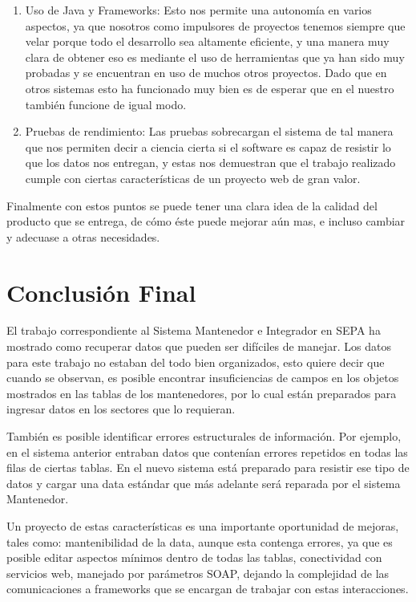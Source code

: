 \documentclass[a4paper,12pt,openany,oneside]{book}
\begin{document}
\begin{enumerate}
        \item Uso de Java y Frameworks: Esto nos permite una autonomía en varios aspectos, ya que nosotros como impulsores de proyectos tenemos siempre que velar porque todo el desarrollo sea altamente eficiente, y una manera muy clara de obtener eso es mediante el uso de herramientas que ya han sido muy probadas y se encuentran en uso de muchos otros proyectos. Dado que en otros sistemas esto ha funcionado muy bien es de esperar que en el nuestro también funcione de igual modo.
        \item Pruebas de rendimiento: Las pruebas sobrecargan el sistema de tal manera que nos permiten decir a ciencia cierta si el software es capaz de resistir lo que los datos nos entregan, y estas nos demuestran que el trabajo realizado cumple con ciertas características de un proyecto web de gran valor.
\end{enumerate}

Finalmente con estos puntos se puede tener una clara idea de la calidad del producto que se entrega, de cómo éste puede mejorar aún mas, e incluso cambiar y adecuase a otras necesidades.

\section{Conclusión Final}
El trabajo correspondiente al Sistema Mantenedor e Integrador en SEPA ha mostrado como recuperar datos que pueden ser difíciles de manejar. Los datos para este trabajo no estaban del todo bien organizados, esto quiere decir que cuando se observan, es posible encontrar insuficiencias de campos en los objetos mostrados en las tablas de los mantenedores, por lo cual están preparados para ingresar datos en los sectores que lo requieran.

También es posible identificar errores estructurales de información. Por ejemplo, en el sistema anterior entraban datos que contenían errores repetidos en todas las filas de ciertas tablas. En el nuevo sistema está preparado para resistir ese tipo de datos y cargar una data estándar que más adelante será reparada por el sistema Mantenedor.

Un proyecto de estas características es una importante oportunidad de mejoras, tales como: mantenibilidad de la data, aunque esta contenga errores, ya que es posible editar aspectos mínimos dentro de todas las tablas, conectividad con servicios web, manejado por parámetros SOAP, dejando la complejidad de las comunicaciones a frameworks que se encargan de trabajar con estas interacciones.
\end{document}
